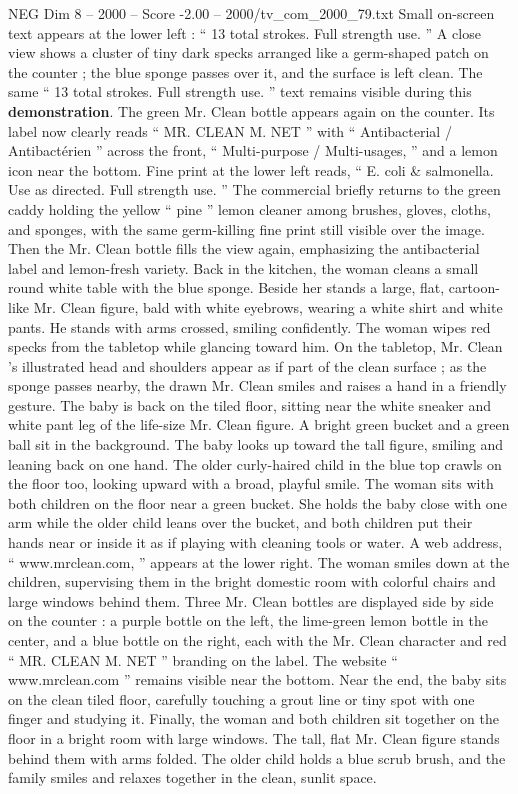 \begin{textsample}{NEG Dim 8 – 2000 – Score -2.00 – 2000/tv\_com\_2000\_79.txt}
Small on-screen text appears at the lower left : “ 13 total strokes.
Full strength use. ” A close view shows a cluster of tiny dark specks arranged like a germ-shaped patch on the counter ; the blue sponge passes over it, and the surface is left clean.
The same “ 13 total strokes.
Full strength use. ” text remains visible during this \textbf{demonstration}.
The green Mr.
Clean bottle appears again on the counter.
Its label now clearly reads “ MR.
CLEAN M.
NET ” with “ Antibacterial / Antibactérien ” across the front, “ Multi-purpose / Multi-usages, ” and a lemon icon near the bottom.
Fine print at the lower left reads, “ E. coli \& salmonella.
Use as directed.
Full strength use. ” The commercial briefly returns to the green caddy holding the yellow “ pine ” lemon cleaner among brushes, gloves, cloths, and sponges, with the same germ-killing fine print still visible over the image.
Then the Mr.
Clean bottle fills the view again, emphasizing the antibacterial label and lemon-fresh variety.
Back in the kitchen, the woman cleans a small round white table with the blue sponge.
Beside her stands a large, flat, cartoon-like Mr.
Clean figure, bald with white eyebrows, wearing a white shirt and white pants.
He stands with arms crossed, smiling confidently.
The woman wipes red specks from the tabletop while glancing toward him.
On the tabletop, Mr.
Clean ’s illustrated head and shoulders appear as if part of the clean surface ; as the sponge passes nearby, the drawn Mr.
Clean smiles and raises a hand in a friendly gesture.
The baby is back on the tiled floor, sitting near the white sneaker and white pant leg of the life-size Mr.
Clean figure.
A bright green bucket and a green ball sit in the background.
The baby looks up toward the tall figure, smiling and leaning back on one hand.
The older curly-haired child in the blue top crawls on the floor too, looking upward with a broad, playful smile.
The woman sits with both children on the floor near a green bucket.
She holds the baby close with one arm while the older child leans over the bucket, and both children put their hands near or inside it as if playing with cleaning tools or water.
A web address, “ www.mrclean.com, ” appears at the lower right.
The woman smiles down at the children, supervising them in the bright domestic room with colorful chairs and large windows behind them.
Three Mr.
Clean bottles are displayed side by side on the counter : a purple bottle on the left, the lime-green lemon bottle in the center, and a blue bottle on the right, each with the Mr.
Clean character and red “ MR.
CLEAN M.
NET ” branding on the label.
The website “ www.mrclean.com ” remains visible near the bottom.
Near the end, the baby sits on the clean tiled floor, carefully touching a grout line or tiny spot with one finger and studying it.
Finally, the woman and both children sit together on the floor in a bright room with large windows.
The tall, flat Mr.
Clean figure stands behind them with arms folded.
The older child holds a blue scrub brush, and the family smiles and relaxes together in the clean, sunlit space.

\end{textsample}
